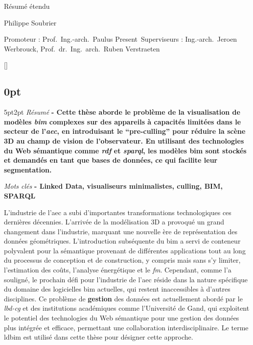 \begin{center}
    \sffamily
    \huge Résumé étendu

    \Large Philippe Soubrier

    \normalsize
    Promoteur : Prof.\ Ing.-arch.\ Paulus Present\
    Superviseurs : Ing.-arch.\ Jeroen Werbrouck, Prof.\ dr.\ Ing.\ arch.\ Ruben Verstraeten
\end{center}
\begin{refsection}
    []{}
    \begin{multicols}{2}
        \small
        \titlespacing\subsection{0pt}{5pt}{2pt}
        \emph{Résumé} \textbf{
            - Cette thèse aborde le problème de la visualisation de modèles \emph{\ac{bim}} complexes sur des appareils à capacités limitées dans le secteur de l'\emph{\ac{aec}}, en introduisant le \enquote{pre-culling} pour réduire la scène 3D au champ de vision de l'observateur. En utilisant des technologies du Web sémantique comme \emph{\ac{rdf}} et \emph{\ac{sparql}}, les modèles \ac{bim} sont stockés et demandés en tant que bases de données, ce qui facilite leur segmentation.
        }

        \emph{Mots clés} \textbf{
            - Linked Data, visualiseurs minimalistes, culling, BIM, SPARQL
        }

        L'industrie de l'\ac{aec} a subi d'importantes transformations technologiques ces dernières décennies. L'arrivée de la modélisation 3D a provoqué un grand changement dans l'industrie, marquant une nouvelle ère de représentation des données géométriques. L'introduction subséquente du \ac{bim} a servi de conteneur polyvalent pour la sémantique provenant de différentes applications tout au long du processus de conception et de construction, y compris mais sans s'y limiter, l'estimation des coûts, l'analyse énergétique et le \emph{\ac{fm}}. Cependant, comme \cite{Werbrouck2018} l'a souligné, le prochain défi pour l'industrie de l'\ac{aec} réside dans la nature spécifique du domaine des logicielles \ac{bim} actuelles, qui restent inaccessibles à d'autres disciplines. Ce problème de \textbf{gestion} des données est actuellement abordé par le \emph{\ac{lbd-cg}} et des institutions académiques comme l'Université de Gand, qui exploitent le potentiel des technologies du Web sémantique pour une gestion des données plus intégrée et efficace, permettant une collaboration interdisciplinaire. Le terme \ac{ldbim} est utilisé dans cette thèse pour désigner cette approche.


\end{multicols}
\end{refsection}
